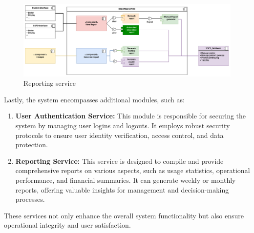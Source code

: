 \begin{figure}[H]
    \includegraphics[max width = 0.9\linewidth,origin = c]{chapters/6. architecture-design/Component Diagram/report.png}
    \caption{Reporting service}%
\end{figure}
Lastly, the system encompasses additional modules, such as:
\begin{enumerate}
    \item \textbf{User Authentication Service:} This module is responsible for securing the system by managing user logins and logouts. It employs robust security protocols to ensure user identity verification, access control, and data protection.
    \item \textbf{Reporting Service:} This service is designed to compile and provide comprehensive reports on various aspects, such as usage statistics, operational performance, and financial summaries. It can generate weekly or monthly reports, offering valuable insights for management and decision-making processes.
\end{enumerate}
These services not only enhance the overall system functionality but also ensure operational integrity and user satisfaction.